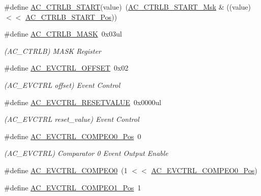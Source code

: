 \begin{DoxyCompactItemize}
\item 
\#define \mbox{\hyperlink{group___s_a_m_d21___a_c_ga2e0762e0d784e23812c63d912820843b}{A\+C\+\_\+\+C\+T\+R\+L\+B\+\_\+\+S\+T\+A\+RT}}(value)~(\mbox{\hyperlink{group___s_a_m_d21___a_c_gade31a7da59dce5680a3b3d649d659785}{A\+C\+\_\+\+C\+T\+R\+L\+B\+\_\+\+S\+T\+A\+R\+T\+\_\+\+Msk}} \& ((value) $<$$<$ \mbox{\hyperlink{group___s_a_m_d21___a_c_ga5699a352a32415762e7ae47f727c34e2}{A\+C\+\_\+\+C\+T\+R\+L\+B\+\_\+\+S\+T\+A\+R\+T\+\_\+\+Pos}}))
\item 
\#define \mbox{\hyperlink{group___s_a_m_d21___a_c_ga877d20a90ea3bf5063d3465e511670bf}{A\+C\+\_\+\+C\+T\+R\+L\+B\+\_\+\+M\+A\+SK}}~0x03ul
\begin{DoxyCompactList}\small\item\em (A\+C\+\_\+\+C\+T\+R\+LB) M\+A\+SK Register \end{DoxyCompactList}\item 
\#define \mbox{\hyperlink{group___s_a_m_d21___a_c_ga2084b522a096a69a32b82b24e5e56b35}{A\+C\+\_\+\+E\+V\+C\+T\+R\+L\+\_\+\+O\+F\+F\+S\+ET}}~0x02
\begin{DoxyCompactList}\small\item\em (A\+C\+\_\+\+E\+V\+C\+T\+RL offset) Event Control \end{DoxyCompactList}\item 
\#define \mbox{\hyperlink{group___s_a_m_d21___a_c_gada78dcdc73d5a68c8647ba0ec61004e3}{A\+C\+\_\+\+E\+V\+C\+T\+R\+L\+\_\+\+R\+E\+S\+E\+T\+V\+A\+L\+UE}}~0x0000ul
\begin{DoxyCompactList}\small\item\em (A\+C\+\_\+\+E\+V\+C\+T\+RL reset\+\_\+value) Event Control \end{DoxyCompactList}\item 
\#define \mbox{\hyperlink{group___s_a_m_d21___a_c_gaa70b302d7f87b0f6d8ab915ca5b7bf8f}{A\+C\+\_\+\+E\+V\+C\+T\+R\+L\+\_\+\+C\+O\+M\+P\+E\+O0\+\_\+\+Pos}}~0
\begin{DoxyCompactList}\small\item\em (A\+C\+\_\+\+E\+V\+C\+T\+RL) Comparator 0 Event Output Enable \end{DoxyCompactList}\item 
\#define \mbox{\hyperlink{group___s_a_m_d21___a_c_ga443162f47e422d7b23d30f50e9aea4f9}{A\+C\+\_\+\+E\+V\+C\+T\+R\+L\+\_\+\+C\+O\+M\+P\+E\+O0}}~(1 $<$$<$ \mbox{\hyperlink{group___s_a_m_d21___a_c_gaa70b302d7f87b0f6d8ab915ca5b7bf8f}{A\+C\+\_\+\+E\+V\+C\+T\+R\+L\+\_\+\+C\+O\+M\+P\+E\+O0\+\_\+\+Pos}})
\item 
\#define \mbox{\hyperlink{group___s_a_m_d21___a_c_ga2a8ed3ce927004e2e47d23ece31c48be}{A\+C\+\_\+\+E\+V\+C\+T\+R\+L\+\_\+\+C\+O\+M\+P\+E\+O1\+\_\+\+Pos}}~1

\end{DoxyCompactItemize}
